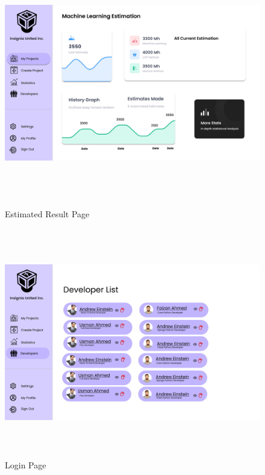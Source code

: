 \begin{figure}[H]
    \centering 
\includegraphics[height=10cm, width=1\textwidth]{./images/prototype/0013}
\centering 
\caption{Estimated Result Page}
\label{fig:prototype1}


\includegraphics[height=10cm, width=1\textwidth]{./images/prototype/0005}
\caption{Login Page}
\label{fig:prototype1}
\end{figure}

